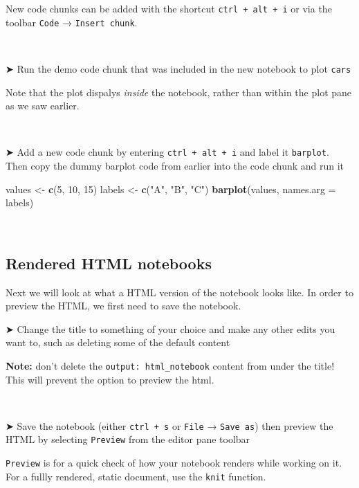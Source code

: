 \documentclass[
]{book}
\newenvironment{Shaded}{\begin{snugshade}}{\end{snugshade}}
\newcommand{\AttributeTok}[1]{\textcolor[rgb]{0.13,0.29,0.53}{#1}}
\newcommand{\DecValTok}[1]{\textcolor[rgb]{0.00,0.00,0.81}{#1}}
\newcommand{\FunctionTok}[1]{\textcolor[rgb]{0.13,0.29,0.53}{\textbf{#1}}}
\newcommand{\NormalTok}[1]{#1}
\newcommand{\OtherTok}[1]{\textcolor[rgb]{0.56,0.35,0.01}{#1}}
\newcommand{\StringTok}[1]{\textcolor[rgb]{0.31,0.60,0.02}{#1}}
\begin{document}
New code chunks can be added with the shortcut \texttt{ctrl\ +\ alt\ +\ i} or via the toolbar \texttt{Code} → \texttt{Insert\ chunk}.

~

➤ Run the demo code chunk that was included in the new notebook to plot \texttt{cars}

Note that the plot dispalys \emph{inside} the notebook, rather than within the plot pane as we saw earlier.

~

➤ Add a new code chunk by entering \texttt{ctrl\ +\ alt\ +\ i} and label it \texttt{barplot}. Then copy the dummy barplot code from earlier into the code chunk and run it

\begin{Shaded}
\begin{Highlighting}[]
\NormalTok{values }\OtherTok{\textless{}{-}} \FunctionTok{c}\NormalTok{(}\DecValTok{5}\NormalTok{, }\DecValTok{10}\NormalTok{, }\DecValTok{15}\NormalTok{)}
\NormalTok{labels }\OtherTok{\textless{}{-}} \FunctionTok{c}\NormalTok{(}\StringTok{"A"}\NormalTok{, }\StringTok{"B"}\NormalTok{, }\StringTok{"C"}\NormalTok{)}
\FunctionTok{barplot}\NormalTok{(values, }\AttributeTok{names.arg =}\NormalTok{ labels)}
\end{Highlighting}
\end{Shaded}

~

\hypertarget{rendered-html-notebooks}{%
\subsection{Rendered HTML notebooks}\label{rendered-html-notebooks}}

Next we will look at what a HTML version of the notebook looks like. In order to preview the HTML, we first need to save the notebook.

➤ Change the title to something of your choice and make any other edits you want to, such as deleting some of the default content

\textbf{Note:} don't delete the \texttt{output:\ html\_notebook} content from under the title! This will prevent the option to preview the html.

~

➤ Save the notebook (either \texttt{ctrl\ +\ s} or \texttt{File} → \texttt{Save\ as}) then preview the HTML by selecting \texttt{Preview} from the editor pane toolbar

\texttt{Preview} is for a quick check of how your notebook renders while working on it. For a fullly rendered, static document, use the \texttt{knit} function.
\end{document}
